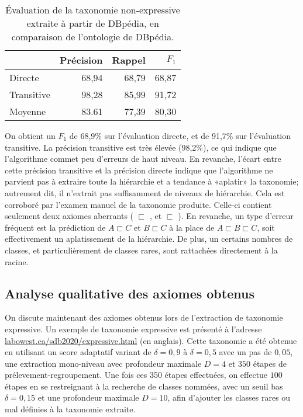 \begin{table}[h]
    \centering
    \caption[Évaluation de la taxonomie non-expressive extraite sur DBpédia]{Évaluation de la taxonomie non-expressive extraite à partir de DBpédia, en comparaison de l'ontologie de DBpédia.}
    \begin{tabular}{|lrrr|}
        \hline
             & Précision  & Rappel & $F_1$ \\
        \hline
        Directe   &	68,94	&	68,79	&	68,87 \\
        Transitive  &	98,28	&	85,99	&	91,72 \\
        Moyenne & 83.61 & 77,39 & 80,30 \\
        \hline
    \end{tabular}
    \label{tab:extraction-results}
\end{table}

On obtient un $F_1$ de 68,9\% sur l'évaluation directe, et de 91,7\% sur l'évaluation transitive. La précision transitive est très élevée (98,2\%), ce qui indique que l'algorithme commet peu d'erreurs de haut niveau. En revanche, l'écart entre cette précision transitive et la précision directe indique que l'algorithme ne parvient pas à extraire toute la hiérarchie et a tendance à «aplatir» la taxonomie; autrement dit, il n'extrait pas suffisamment de niveaux de hiérarchie. Cela est corroboré par l'examen manuel de la taxonomie produite. Celle-ci contient seulement deux axiomes aberrants ( $\sqsubset$ , et  $\sqsubset$ ). En revanche, un type d'erreur fréquent est la prédiction de $A \sqsubset C$ et $B \sqsubset C$ à la place de $A \sqsubset B \sqsubset C$, soit effectivement un aplatissement de la hiérarchie. De plus, un certains nombres de classes, et particulièrement de classes rares, sont rattachées directement à la racine.




\subsection{Analyse qualitative des axiomes obtenus}
\label{subsec:texp-reslts-quali}

On discute maintenant des axiomes obtenus lors de l'extraction de taxonomie expressive. Un exemple de taxonomie expressive est présenté à l'adresse \href{http://labowest.ca/sdb2020/expressive.html}{labowest.ca/sdb2020/expressive.html} (en anglais). Cette taxonomie a été obtenue en utilisant un score adaptatif variant de $\delta = 0,9$ à $\delta = 0,5$ avec un pas de $0,05$, une extraction mono-niveau avec profondeur maximale $D=4$ et $350$ étapes de prélevement-regroupement. Une fois ces 350 étapes effectuées, on effectue $100$ étapes en se restreignant à la recherche de classes nommées, avec un seuil bas $\delta = 0,15$ et une profondeur maximale $D=10$, afin d'ajouter les classes rares ou mal définies à la taxonomie extraite.

